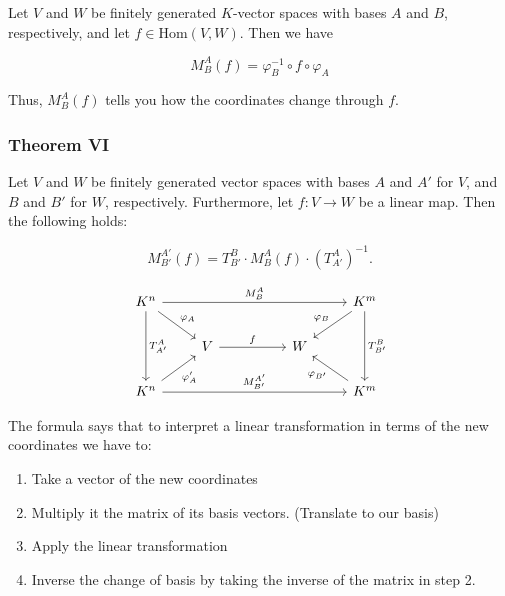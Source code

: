 Let \( V \) and \( W \) be finitely generated \( K \)-vector spaces with 
bases \(A\) and \(B\), respectively, and let \( f \in \mathrm{Hom}(V, W) \).
Then we have

\[
    M_B^A(f) = \varphi_B^{-1} \circ f \circ \varphi_A
\]

Thus, \( M_B^A(f) \) tells you how the coordinates change through \(f\).

\subsubsection{Theorem VI} 

Let \( V \) and \( W \) be finitely generated vector spaces with bases \(A\) and \( A' \) 
for \( V \), and \(B\) and \( B' \) for \( W \), respectively.  Furthermore, let \( f: V \to W \) be 
a linear map. Then the following holds:

\[
    M_{B'}^{A'}(f) = T_{B'}^{B} \cdot M_{B}^{A}(f) \cdot {\left( T_{A'}^{A} \right)}^{-1}.
\]

\[
    \begin{tikzcd}
        K^n \arrow[dd, "T_{A'}^{A}"] \arrow[rrrr, "M_{B}^{A}"] \arrow[rd, "\varphi_A"] &                   &  &   & K^m \arrow[dd, "T_{B'}^{B}"] \arrow[ld, "\varphi_B"'] \\
                                                                                       & V \arrow[rr, "f"] &  & W &                                                       \\
        K^n \arrow[rrrr, "M_{B'}^{A'}"] \arrow[ru, "\varphi_{A}'"']                    &                   &  &   & K^m \arrow[lu, "\varphi_{B'}"]                       
    \end{tikzcd}
\]

The formula says that to interpret a linear transformation in terms of the
new coordinates we have to:

\begin{enumerate}
    \item Take a vector of the new coordinates
    \item Multiply it the matrix of its basis vectors. (Translate to our basis)
    \item Apply the linear transformation
    \item Inverse the change of basis by taking the inverse of the 
    matrix in step 2.
\end{enumerate}
